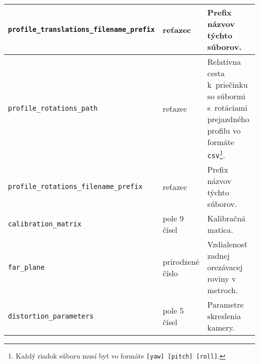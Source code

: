\begin{landscape}
\begin{longtable}{>{}p{20em}|>{}p{8em}|>{}p{28em}}
    \texttt{profile\_translations\_filename\_prefix} & reťazec & Prefix názvov týchto súborov. \\ \hline
    \texttt{profile\_rotations\_path} & reťazec & Relatívna cesta k~priečinku so súbormi s~rotáciami prejazdného profilu vo formáte \texttt{csv}\footnote{Každý riadok súboru musí byť vo formáte \texttt{[yaw] [pitch] [roll]}.}. \\ \hline
    \texttt{profile\_rotations\_filename\_prefix} & reťazec & Prefix názvov týchto súborov. \\ \hline
    \texttt{calibration\_matrix} & pole 9 čísel & Kalibračná matica. \\ \hline
    \texttt{far\_plane} & prirodzené číslo & Vzdialenosť zadnej orezávacej roviny v metroch. \\ \hline
    \texttt{distortion\_parameters} & pole 5 čísel & Parametre skreslenia kamery.
\end{longtable}
\end{landscape}


%
